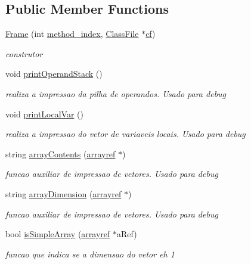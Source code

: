 \subsection*{Public Member Functions}
\begin{DoxyCompactItemize}
\item 
\hyperlink{classFrame_a0a710d74c28a542687e64715300cb8fb}{Frame} (int \hyperlink{classFrame_a9a7eb96be80ac389517368b48f88e1f5}{method\+\_\+index}, \hyperlink{classClassFile}{Class\+File} $\ast$\hyperlink{classFrame_a1adaa34d477660f1e9d45904576eacf2}{cf})
\begin{DoxyCompactList}\small\item\em construtor \end{DoxyCompactList}\item 
void \hyperlink{classFrame_a58199d48ff5d3b2c86aea6f79a8ccf10}{print\+Operand\+Stack} ()
\begin{DoxyCompactList}\small\item\em realiza a impressao da pilha de operandos. Usado para debug \end{DoxyCompactList}\item 
void \hyperlink{classFrame_ab34a9033d268d94f205721b63101b047}{print\+Local\+Var} ()
\begin{DoxyCompactList}\small\item\em realiza a impressao do vetor de variaveis locais. Usado para debug \end{DoxyCompactList}\item 
string \hyperlink{classFrame_a38bb752fbb562c457ae9cdeb1f07a2e0}{array\+Contents} (\hyperlink{heap_8hpp_a02f27b1f1856ad001bcd2be51cef4faf}{arrayref} $\ast$)
\begin{DoxyCompactList}\small\item\em funcao auxiliar de impressao de vetores. Usado para debug \end{DoxyCompactList}\item 
string \hyperlink{classFrame_adb2182aa57694757b5269ac54642cb92}{array\+Dimension} (\hyperlink{heap_8hpp_a02f27b1f1856ad001bcd2be51cef4faf}{arrayref} $\ast$)
\begin{DoxyCompactList}\small\item\em funcao auxiliar de impressao de vetores. Usado para debug \end{DoxyCompactList}\item 
bool \hyperlink{classFrame_a9201c31d34a0992a30bdda70f8898c1c}{is\+Simple\+Array} (\hyperlink{heap_8hpp_a02f27b1f1856ad001bcd2be51cef4faf}{arrayref} $\ast$a\+Ref)
\begin{DoxyCompactList}\small\item\em funcao que indica se a dimensao do vetor eh 1 \end{DoxyCompactList}\end{DoxyCompactItemize}
